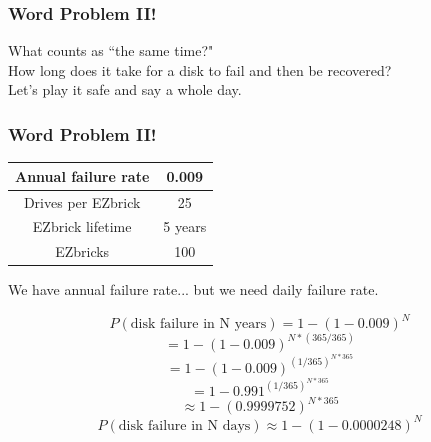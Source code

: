 \documentclass{beamer}
\theoremstyle{mystyle}
\begin{document}
\begin{frame}
\frametitle{Word Problem II!}
	
	\begin{center}
		What counts as ``the same time?" \\
		How long does it take for a disk to fail and then be recovered? \\
		
		\pause 
		\vspace{0.2in}
		Let's play it safe and say a whole day. 
	\end{center}
	
\end{frame}

\begin{frame}
\frametitle{Word Problem II!}

\begin{center}
	\begin{tabular}{ | c | c | }
		\hline Annual failure rate & 0.009 \\
		\hline Drives per EZbrick & 25 \\
		\hline EZbrick lifetime & 5 years \\
		\hline EZbricks & 100 \\
		\hline 	
	\end{tabular}
\end{center}

\begin{center}
	We have annual failure rate... but we need daily failure rate.

\pause

\[ P(\text{disk failure in N years}) = 1 - (1 - 0.009)^N \]
\vspace*{-\baselineskip} \pause  \[ = 1 - (1 - 0.009)^{N*(365/365)} \]
\vspace*{-\baselineskip} \pause \[ = 1 - (1 - 0.009)^{(1/365)^{N*365}} \]
\vspace*{-\baselineskip} \pause \[ = 1 - 0.991^{(1/365)^{N*365}}\]
\vspace*{-\baselineskip} \pause \[ \approx 1 - (0.9999752)^{N*365}\]
\vspace*{-\baselineskip} \pause \[ P(\text{disk failure in N days}) \approx 1 - (1 - 0.0000248) ^N \]

\end{center}

	
\end{frame}
\end{document}
